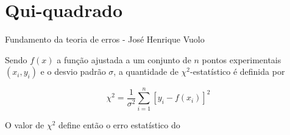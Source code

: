 \chapter{Qui-quadrado} \label{apdx:qui-quadrado}

Fundamento da teoria de erros - José Henrique Vuolo

Sendo $f(x)$ a função ajustada a um conjunto de $n$ pontos experimentais $(x_i, y_i)$ e o desvio padrão $\sigma$, a quantidade de $\chi^2$-estatístico é definida por

\begin{equation}
\chi^2 = \dfrac{1}{\sigma^2} \sum_{i=1}^{n}[y_i - f(x_i)]^2
\end{equation}

O valor de $\chi^2$ define então o erro estatístico do